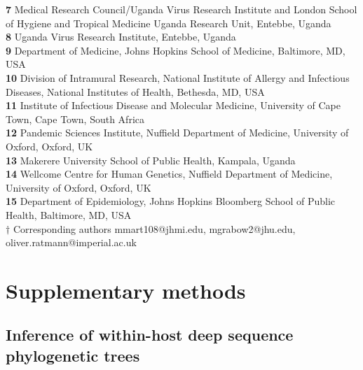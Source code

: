 \documentclass[10pt,letterpaper]{article}
\begin{document}
\begin{flushleft}
\textbf{7} Medical Research Council/Uganda Virus Research Institute and London School of Hygiene and Tropical Medicine Uganda Research Unit, Entebbe, Uganda \\

\textbf{8} Uganda Virus Research Institute, Entebbe, Uganda \\

\textbf{9} Department of Medicine, Johns Hopkins School of Medicine, Baltimore, MD, USA
\\
\textbf{10} Division of Intramural Research, National Institute of Allergy and Infectious Diseases, National Institutes of Health, Bethesda, MD, USA
\\
\textbf{11} Institute of Infectious Disease and Molecular Medicine, University of Cape Town, Cape Town, South Africa
\\
\textbf{12} Pandemic Sciences Institute, Nuffield Department of Medicine, University of Oxford, Oxford, UK \\

\textbf{13} Makerere University School of Public Health, Kampala, Uganda \\

\textbf{14} Wellcome Centre for Human Genetics, Nuffield Department of Medicine, University of Oxford, Oxford, UK \\

\textbf{15} Department of Epidemiology, Johns Hopkins Bloomberg School of Public Health, Baltimore, MD, USA \\

\bigskip
$\dagger$ Corresponding authors mmart108@jhmi.edu, mgrabow2@jhu.edu, oliver.ratmann@imperial.ac.uk 
\end{flushleft}

\section{Supplementary methods}
\subsection{Inference of within-host deep sequence phylogenetic trees}
\end{document}
